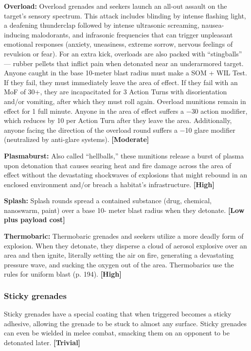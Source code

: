 \textbf{Overload:} Overload grenades and seekers launch an all-out assault on the target’s sensory spectrum. This attack includes blinding by intense flashing light, a deafening thunderclap followed by intense ultrasonic screaming, nausea-inducing malodorants, and infrasonic frequencies that can trigger unpleasant emotional responses (anxiety, uneasiness, extreme sorrow, nervous feelings of revulsion or fear). For an extra kick, overloads are also packed with ``stingballs'' --- rubber pellets that inflict pain when detonated near an underarmored target. Anyone caught in the base 10-meter blast radius must make a SOM + WIL Test. If they fail, they must immediately leave the area of effect. If they fail with an MoF of 30+, they are incapacitated for 3 Action Turns with disorientation and/or vomiting, after which they must roll again. Overload munitions remain in effect for 1 full minute. Anyone in the area of effect suffers a $-$30 action modifier, which reduces by 10 per Action Turn after they leave the area. Additionally, anyone facing the direction of the overload round suffers a $-$10 glare modifier (neutralized by anti-glare systems). \textbf{[Moderate]} 

\textbf{Plasmaburst:} Also called ``hellballs,'' these munitions release a burst of plasma upon detonation that causes searing heat and fire damage across the area of effect without the devastating shockwaves of explosions that might rebound in an enclosed environment and/or breach a habitat’s infrastructure. \textbf{[High]} 

\textbf{Splash:} Splash rounds spread a contained substance (drug, chemical, nanoswarm, paint) over a base 10- meter blast radius when they detonate. \textbf{[Low plus payload cost]} 

\textbf{Thermobaric:} Thermobaric grenades and seekers utilize a more deadly form of explosion. When they detonate, they disperse a cloud of aerosol explosive over an area and then ignite, literally setting the air on fire, generating a devastating pressure wave, and sucking the oxygen out of the area. Thermobarics use the rules for uniform blast (p. 194). \textbf{[High]} 

\subsubsection{Sticky grenades} 

Sticky grenades have a special coating that when triggered becomes a sticky adhesive, allowing the grenade to be stuck to almost any surface. Sticky grenades can even be wielded in melee combat, smacking them on an opponent to be detonated later. \textbf{[Trivial]} 

